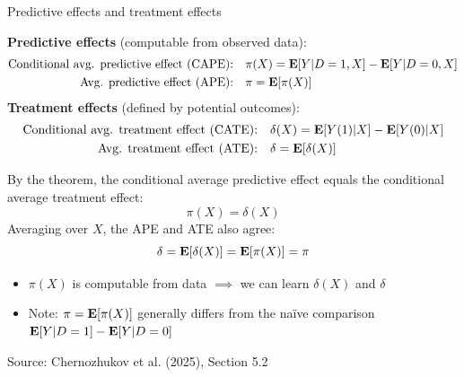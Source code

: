 \documentclass[compress, 8pt]{beamer}
\begin{document}
\begin{frame}{Predictive effects and treatment effects}

\textbf{Predictive effects} (computable from observed data):
\begin{align*}
    \text{Conditional avg. predictive effect (CAPE):} \quad & \pi(X) = \mathbf{E} [Y \vert D=1, X] - \mathbf{E} [Y \vert D=0, X] \\
    \text{Avg. predictive effect (APE):} \quad & \pi = \mathbf{E} [\pi(X)]
\end{align*}
\textbf{Treatment effects} (defined by potential outcomes):
\begin{align*}
    \text{Conditional avg. treatment effect (CATE):} \quad & \delta(X) = \mathbf{E} [Y(1) \vert X] - \mathbf{E} [Y(0) \vert X] \\
    \text{Avg. treatment effect (ATE):} \quad & \delta = \mathbf{E} [\delta(X)]
\end{align*}

\pause
\vspace{2ex}
By the theorem, the conditional average predictive effect equals the conditional average treatment effect:
\begin{equation*}
    \pi(X) = \delta(X)
\end{equation*}
Averaging over $X$, the APE and ATE also agree:
\begin{equation*}
    \delta = \mathbf{E} [\delta(X)] = \mathbf{E} [\pi(X)] = \pi
\end{equation*}

\pause
\vspace{2ex}
\begin{itemize}
    \item $\pi(X)$ is computable from data $\implies$ we can learn $\delta(X)$ and $\delta$
    \item Note: $\pi = \mathbf{E}[\pi(X)]$ generally differs from the na{\"i}ve comparison $\mathbf{E} [Y \vert D=1] - \mathbf{E} [Y \vert D=0]$
\end{itemize}

\vspace{2ex}
{\footnotesize Source: Chernozhukov et al. (2025), Section 5.2}
\end{frame}
\end{document}
